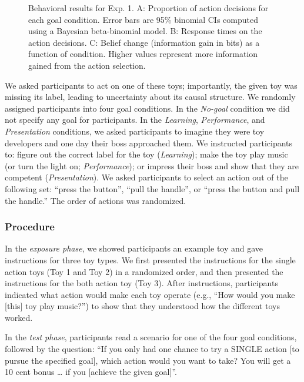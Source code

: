 \documentclass[10pt, letterpaper]{article}
\newenvironment{CodeChunk}{}{}
\begin{document}
\begin{CodeChunk}
\begin{figure}[H]
{}

\caption[Behavioral results for Exp]{Behavioral results for Exp. 1. A: Proportion of action decisions for each goal condition. Error bars are 95\% binomial CIs computed using a Bayesian beta-binomial model. B: Response times on the action decisions. C: Belief change (information gain in bits) as a function of condition. Higher values represent more information gained from the action selection.}\label{fig:e1_behav_results_plot}
\end{figure}
\end{CodeChunk}

We asked participants to act on one of these toys; importantly, the
given toy was missing its label, leading to uncertainty about its causal
structure. We randomly assigned participants into four goal conditions.
In the \emph{No-goal} condition we did not specify any goal for
participants. In the \emph{Learning}, \emph{Performance}, and
\emph{Presentation} conditions, we asked participants to imagine they
were toy developers and one day their boss approached them. We
instructed participants to: figure out the correct label for the toy
(\emph{Learning}); make the toy play music (or turn the light on;
\emph{Performance}); or impress their boss and show that they are
competent (\emph{Presentation}). We asked participants to select an
action out of the following set: ``press the button'', ``pull the
handle'', or ``press the button and pull the handle.'' The order of
actions was randomized.

\subsubsection{Procedure}\label{procedure}

In the \emph{exposure phase}, we showed participants an example toy and
gave instructions for three toy types. We first presented the
instructions for the single action toys (Toy 1 and Toy 2) in a
randomized order, and then presented the instructions for the both
action toy (Toy 3). After instructions, participants indicated what
action would make each toy operate (e.g., ``How would you make
{[}this{]} toy play music?'') to show that they understood how the
different toys worked.

In the \emph{test phase}, participants read a scenario for one of the
four goal conditions, followed by the question: ``If you only had one
chance to try a SINGLE action {[}to pursue the specified goal{]}, which
action would you want to take? You will get a 10 cent bonus \ldots{} if
you {[}achieve the given goal{]}''.
\end{document}
